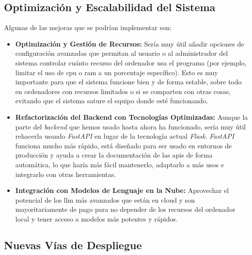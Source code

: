 \subsection{Optimización y Escalabilidad del Sistema}
Algunas de las mejoras que se podrían implementar son:

\begin{itemize}
\item \textbf{Optimización y Gestión de Recursos:} Sería muy útil añadir opciones de configuración avanzadas que permitan al usuario o al administrador del sistema controlar cuánto recurso del ordenador usa el programa (por ejemplo, limitar el uso de \gls{cpu} o \gls{ram} a un porcentaje específico). Esto es muy importante para que el sistema funcione bien y de forma estable, sobre todo en ordenadores con recursos limitados o si se comparten con otras cosas, evitando que el sistema sature el equipo donde esté funcionando.
\item \textbf{Refactorización del Backend con Tecnologías Optimizadas:} Aunque la parte del \textit{backend} que hemos usado hasta ahora ha funcionado, sería muy útil rehacerla usando \textit{FastAPI} en lugar de la tecnología actual \textit{Flask}. \textit{FastAPI} funciona mucho más rápido, está diseñado para ser usado en entornos de producción y ayuda a crear la documentación de las \gls{api}s de forma automática, lo que haría más fácil mantenerlo, adaptarlo a más usos e integrarlo con otras herramientas.
\item \textbf{Integración con Modelos de Lenguaje en la Nube:} Aprovechar el potencial de los \gls{llm} más avanzados que están en cloud y son mayoritariamente de pago para no depender de los recursos del ordenador local y tener acceso a modelos más potentes y rápidos.
\end{itemize}

\subsection{Nuevas Vías de Despliegue}

